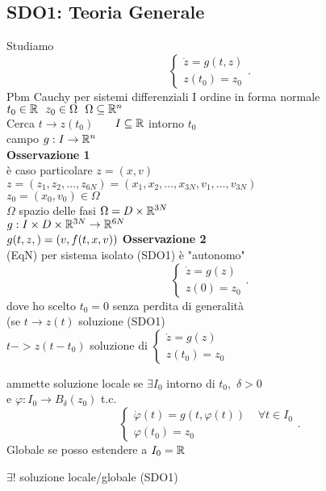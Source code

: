 \documentclass{article}
\begin{document}
\subsection{SDO1: Teoria Generale}
Studiamo 
\[
\begin{cases}
	\dot z = g(t,z)\\
	z(t_0) = z_0
\end{cases}
.\] 
Pbm Cauchy per sistemi differenziali I ordine in forma normale\\
$t_0\in\mathbb{R} \ \ z_0\in\Omega\ \ \Omega\subseteq \mathbb{R}^n$\\
Cerca $t \rightarrow z(t_0)$ \ \ \ $I\subseteq \mathbb{R}$ intorno  $t_0$\\
campo $g: I\time \Omega \rightarrow\R^n$\\
\textbf{Osservazione 1}\\
è caso particolare $z = (x,v)$\\
$z = (z_1,z_2,\ldots,z_{6N}) = (x_1,x_2,\ldots,x_{3N}, v_1,\ldots,v_{3N})$\\
$z_0 = (x_0,v_0)\in\Omega$\\
$\Omega$ spazio delle fasi $\Omega = D\times \mathbb{R}^{3N}$\\
$g: I\times D\times \mathbb{R}^{3N} \rightarrow \mathbb{R}^{6N}$\\
$g(t,z,) = (v,f(t,x,v))\\$
\textbf{Osservazione 2}\\
(EqN) per sistema isolato (SDO1) è "autonomo"\\
\[
\begin{cases}
	\dot z = g(z)\\
	z(0) = z_0
\end{cases}
.\] 
dove ho scelto $t_0 = 0$ senza perdita di generalità\\
(se $t \rightarrow z(t)$ soluzione (SDO1)\\
$t -> z(t-t_0)$ soluzione di $ \begin{cases}
	\dot z = g(z)\\
	z(t_0) = z_0
\end{cases}$\\
\begin{defi}[SDO1]
	ammette soluzione locale se $\exists I_0$ intorno di $t_0,$ $\delta > 0 $\\
	e  $ \varphi : I_0 \rightarrow B_\delta (z_0)$ t.c.\\
	\[
	\begin{cases}
		\dot \varphi(t) = g(t, \varphi(t)) \ \ \ \ \ \forall t\in I_0\\
		\varphi(t_0) = z_0
	\end{cases}
	.\] 
	Globale se posso estendere a $I_0 = \mathbb{R}$
\end{defi}
\begin{teo}
	$\exists !$ soluzione locale/globale (SDO1)
\end{teo}
\end{document}
